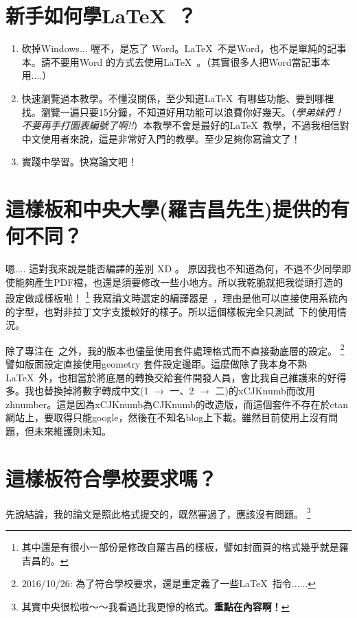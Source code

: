 \documentclass[class=NCU_thesis, crop=false, float=true]{standalone}
\begin{document}
\section{新手如何學\LaTeX\ ？}
\begin{enumerate}
    \item 砍掉Windows... 喔不，是忘了 Word。\LaTeX\ 不是Word，也不是單純的記事本。請不要用Word 的方式去使用\LaTeX\ 。（其實很多人把Word當記事本用....）
    \item 快速瀏覽過本教學。不懂沒關係，至少知道\LaTeX\ 有哪些功能、要到哪裡找。瀏覽一遍只要15分鐘，不知道好用功能可以浪費你好幾天。（\emph{學弟妹們！不要再手打圖表編號了啊!!}）本教學不會是最好的\LaTeX\ 教學，不過我相信對中文使用者來說，這是非常好入門的教學。至少足夠你寫論文了！
    \item 實踐中學習。快寫論文吧！
\end{enumerate}

\section{這樣板和中央大學(羅吉昌先生)提供的有何不同？}
嗯.... 這對我來說是能否編譯的差別 XD 。 原因我也不知道為何，不過不少同學即使能夠產生PDF檔，也還是須要修改一些小地方。所以我乾脆就把我從頭打造的設定做成樣板啦！
\footnote{其中還是有很小一部份是修改自羅吉昌的樣板，譬如封面頁的格式幾乎就是羅吉昌的。}
我寫論文時選定的編譯器是\XeLaTeX\  ，理由是他可以直接使用系統內的字型，也對非拉丁文字支援較好的樣子。所以這個樣板完全只測試\XeLaTeX\ 下的使用情況。

除了專注在\XeLaTeX\ 之外，我的版本也儘量使用套件處理格式而不直接動底層的設定。
\footnote{2016/10/26: 為了符合學校要求，還是重定義了一些\LaTeX\ 指令......}
譬如版面設定直接使用geometry 套件設定邊距。這麼做除了我本身不熟\LaTeX\ 外，也相當於將底層的轉換交給套件開發人員，會比我自己維護來的好得多。我也替換掉將數字轉成中文(1 $\rightarrow$ 一、2 $\rightarrow$ 二)的xCJKnumb而改用zhnumber。這是因為xCJKnumb為CJKnumb的改造版，而這個套件不存在於ctan網站上，要取得只能google，然後在不知名blog上下載。雖然目前使用上沒有問題，但未來維護則未知。

\section{這樣板符合學校要求嗎？}
先說結論，我的論文是照此格式提交的，既然審過了，應該沒有問題。
\footnote{其實中央很松啦～～我看過比我更慘的格式。\textbf{重點在內容啊！}}
\end{document}
